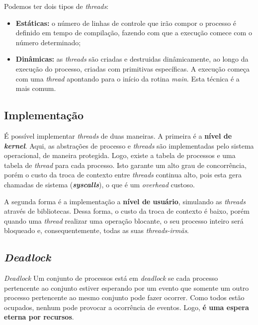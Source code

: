Podemos ter dois tipos de \textit{threads}:
\begin{itemize}
  \item \textbf{Estáticas:} o número de linhas de controle que irão compor o processo é definido em tempo de compilação, fazendo com que a execução comece com o número determinado;

  \item \textbf{Dinâmicas:} as \textit{threads} são criadas e destruidas dinâmicamente, ao longo da execução do processo, criadas com primitivas específicas. A execução começa com uma \textit{thread} apontando para o início da rotina \textit{main}. Esta técnica é a mais comum.
\end{itemize}






\subsection{Implementação}
É possível implementar \textit{threads} de duas maneiras. A primeira é a \textbf{nível de \textit{kernel}}. Aqui, as abstrações de processo e \textit{threads} são implementadas pelo sistema operacional, de maneira protegida. Logo, existe a tabela de processos e uma tabela de \textit{thread} para cada processo. Isto garante um alto grau de concorrência, porém o custo da troca de contexto entre \textit{threads} continua alto, pois esta gera chamadas de sistema (\textbf{\textit{syscalls}}), o que é um \textit{overhead} custoso.

A segunda forma é a implementação a \textbf{nível de usuário}, simulando as \textit{threads} através de bibliotecas. Dessa forma, o custo da troca de contexto é baixo, porém quando uma \textit{thread} realizar uma operação blocante, o seu processo inteiro será bloqueado e, consequentemente, todas as suas \textit{threads-irmãs}.







\subsection{\textit{Deadlock}}
\begin{definicao}{\textit{Deadlock}}
  Um conjunto de processos está em \textit{deadlock} se cada processo pertencente ao conjunto estiver esperando por um evento que somente um outro processo pertencente ao mesmo conjunto pode fazer ocorrer. Como todos estão ocupados, nenhum pode provocar a ocorrência de eventos. Logo, \textbf{é uma espera eterna por recursos}.
\end{definicao}

